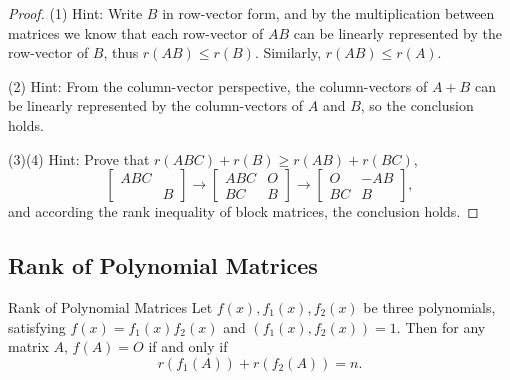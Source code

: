 \begin{proof}
  (1) Hint: Write $B$ in row-vector form, and by the multiplication between
  matrices we know that each row-vector of $AB$ can be linearly represented by
  the row-vector of $B$, thus $r(AB) \leq r(B)$.
  Similarly, $r(AB) \leq r(A)$.

  (2) Hint: From the column-vector perspective,
  the column-vectors of $A + B$ can be linearly represented by
  the column-vectors of $A$ and $B$, so the conclusion holds.

  (3)(4) Hint: Prove that $r(ABC) + r(B) \geq r(AB) + r(BC)$,
  \begin{equation}
    \begin{bmatrix}ABC&\\&B\end{bmatrix}\to\begin{bmatrix}ABC&O\\BC&B\end{bmatrix}\to\begin{bmatrix}O&-AB\\BC&B\end{bmatrix},
  \end{equation}
  and according the rank inequality of block matrices, the conclusion holds.
\end{proof}

\subsection{Rank of Polynomial Matrices}

\begin{theorem}{Rank of Polynomial Matrices}{}
  Let $f(x), f_1(x), f_2(x)$ be three polynomials, satisfying
    $f(x) = f_1(x) f_2(x)$ and $(f_1(x), f_2(x)) = 1$.
    Then for any matrix $A$, $f(A) = O$ if and only if
    \begin{equation}
    r(f_1(A)) + r(f_2(A)) = n.
    \end{equation}
\end{theorem}


